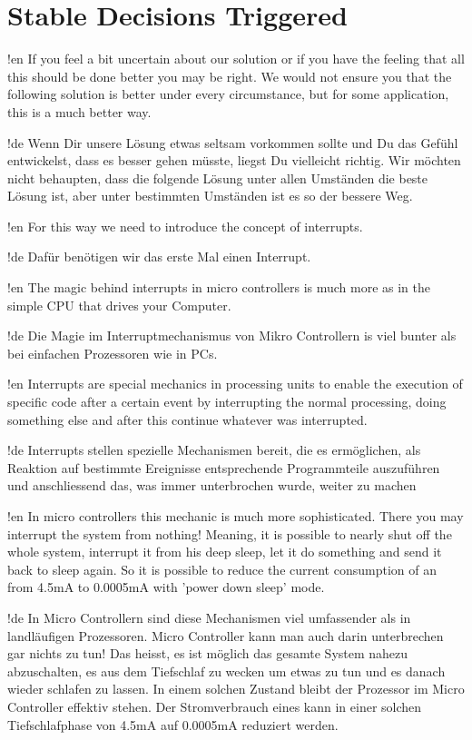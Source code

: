 \section{Stable Decisions Triggered}

!en If you feel a bit uncertain about our solution or if you have the feeling that all this should be done better you may be right. We would not ensure you that the following solution is better under every circumstance, but for some application, this is a much better way.

!de Wenn Dir unsere Lösung etwas seltsam vorkommen sollte und Du das Gefühl entwickelst, dass es besser gehen müsste, liegst Du vielleicht richtig. Wir möchten nicht behaupten, dass die folgende Lösung unter allen Umständen die beste Lösung ist, aber unter bestimmten Umständen ist es so der bessere Weg.



!en For this way we need to introduce the concept of interrupts.

!de Dafür benötigen wir das erste Mal einen Interrupt.



!en The magic behind interrupts in micro controllers is much more as in the simple CPU that drives your Computer.

!de Die Magie im Interruptmechanismus von Mikro Controllern is viel bunter als bei einfachen Prozessoren wie in PCs.



!en Interrupts are special mechanics in processing units to enable the execution of specific code after a certain event by interrupting the normal processing, doing something else and after this continue whatever was interrupted.

!de Interrupts stellen spezielle Mechanismen bereit, die es ermöglichen, als Reaktion auf bestimmte Ereignisse entsprechende Programmteile auszuführen und anschliessend das, was immer unterbrochen wurde, weiter zu machen



!en In micro controllers this mechanic is much more sophisticated. There you may interrupt the system from nothing! Meaning, it is possible to nearly shut off the whole system, interrupt it from his deep sleep, let it do something and send it back to sleep again. So it is possible to reduce the current consumption of an \at{} from 4.5mA to 0.0005mA with 'power down sleep' mode.

!de In Micro Controllern sind diese Mechanismen viel umfassender als in landläufigen Prozessoren. Micro Controller kann man auch darin unterbrechen gar nichts zu tun! Das heisst, es ist möglich das gesamte System nahezu abzuschalten, es aus dem Tiefschlaf zu wecken um etwas zu tun und es danach wieder schlafen zu lassen. In einem solchen Zustand bleibt der Prozessor im Micro Controller effektiv stehen. Der Stromverbrauch eines \at{} kann in einer solchen Tiefschlafphase von 4.5mA auf 0.0005mA reduziert werden.



